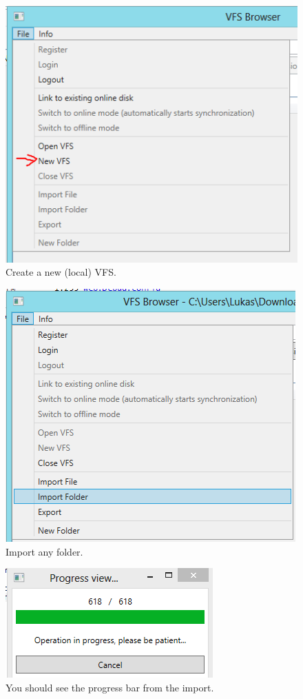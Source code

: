 \documentclass[JCDReport.tex]{subfiles}
\begin{document}
\begin{figure}[h!]
	\centering
	\includegraphics[scale=1]{Images/tutorial/8.png} 
	\caption{Create a new (local) VFS.}
\end{figure}

\begin{figure}[h!]
	\centering
	\includegraphics[scale=1]{Images/tutorial/8_2.png} 
	\caption{Import any folder.}
\end{figure}

\begin{figure}[h!]
	\centering
	\includegraphics[scale=1]{Images/tutorial/9.png} 
	\caption{You should see the progress bar from the import.}
\end{figure}
\end{document}
